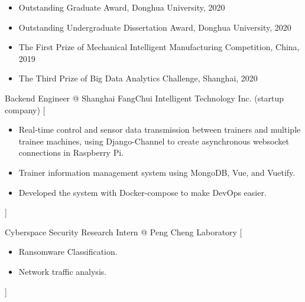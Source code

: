 \documentclass{resume}
\begin{document}
\begin{itemize}
  \item Outstanding Graduate Award, Donghua University, 2020
  \item Outstanding Undergraduate Dissertation Award, Donghua University, 2020
  \item The First Prize of Mechanical Intelligent Manufacturing Competition, China, 2019
  \item The Third Prize of Big Data Analytics Challenge, Shanghai, 2020
\end{itemize}


\begin{experiences}
    {Backend Engineer @ Shanghai FangChui Intelligent Technology Inc. (startup company)}%
    [\begin{itemize}
      \item Real-time control and sensor data transmission between trainers and multiple trainee machines, using Django-Channel to create asynchronous websocket connections in Raspberry Pi.
      \item Trainer information management system using MongoDB, Vue, and Vuetify.
      \item Developed the system with Docker-compose to make DevOps easier.
    \end{itemize}]

  \separator{0.5ex}
    {Cyberspace Security Research Intern @ Peng Cheng Laboratory}%
    [\begin{itemize}
      \item Ransomware Classification.
      \item Network traffic analysis.
    \end{itemize}]
\end{experiences}
\end{document}
